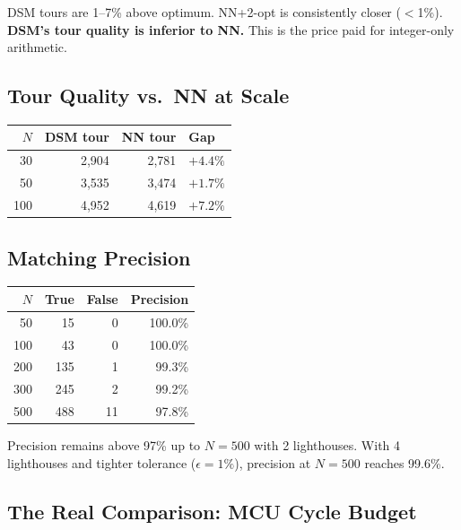 \documentclass[11pt,a4paper,twocolumn]{article}
\begin{document}
DSM tours are 1--7\% above optimum. NN+2-opt is consistently closer ($<$1\%). \textbf{DSM's tour quality is inferior to NN.} This is the price paid for integer-only arithmetic.

\subsection{Tour Quality vs.\ NN at Scale}

\smallskip
\noindent\begin{minipage}{\columnwidth}
\centering\small
{}\label{tab:tour}
\smallskip
\begin{tabular}{@{}rrrl@{}}
\toprule
$N$ & DSM tour & NN tour & Gap \\
\midrule
30 & 2,904 & 2,781 & $+4.4\%$ \\
50 & 3,535 & 3,474 & $+1.7\%$ \\
100 & 4,952 & 4,619 & $+7.2\%$ \\
\bottomrule
\end{tabular}
\end{minipage}
\medskip

\subsection{Matching Precision}

\smallskip
\noindent\begin{minipage}{\columnwidth}
\centering\small
{}\label{tab:prec}
\smallskip
\begin{tabular}{@{}rrrr@{}}
\toprule
$N$ & True & False & Precision \\
\midrule
50 & 15 & 0 & 100.0\% \\
100 & 43 & 0 & 100.0\% \\
200 & 135 & 1 & 99.3\% \\
300 & 245 & 2 & 99.2\% \\
500 & 488 & 11 & 97.8\% \\
\bottomrule
\end{tabular}
\end{minipage}
\medskip

Precision remains above 97\% up to $N{=}500$ with 2 lighthouses. With 4 lighthouses and tighter tolerance ($\epsilon{=}1\%$), precision at $N{=}500$ reaches 99.6\%.

\subsection{The Real Comparison: MCU Cycle Budget}
\end{document}
